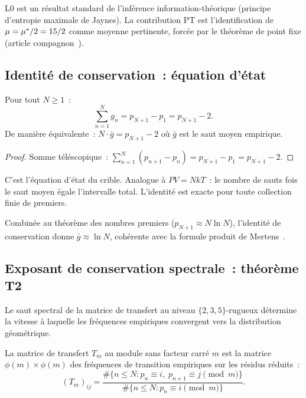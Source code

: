 \documentclass[12pt,a4paper]{article}
\begin{document}
\begin{remarque}
L0 est un résultat standard de l'inférence information-théorique
(principe d'entropie maximale de Jaynes). La contribution PT est
l'identification de $\mu = {\mu^{*}}/2 = 15/2$ comme moyenne
pertinente, forcée par le théorème de point fixe (article
compagnon~\cite{companion_M3}).
\end{remarque}

\subsection{Identité de conservation~: équation d'état}
\label{sec:conservation_id}

\mID
\begin{idbox}
\label{id:conservation}
Pour tout $N \geq 1$~:
\begin{equation}
  \sum_{n=1}^{N} g_n = p_{N+1} - p_1 = p_{N+1} - 2.
  \label{eq:conservation}
\end{equation}
De manière équivalente~: $N \cdot \bar g = p_{N+1} - 2$ où $\bar g$
est le saut moyen empirique.

\begin{proof}
Somme téléscopique~:
$\sum_{n=1}^N (p_{n+1} - p_n) = p_{N+1} - p_1 = p_{N+1} - 2$.
\end{proof}
\end{idbox}

C'est l'équation d'état du crible. Analogue à $PV = NkT$~: le nombre
de sauts fois le saut moyen égale l'intervalle total. L'identité est
exacte pour toute collection finie de premiers.

Combinée au théorème des nombres premiers
($p_{N+1} \approx N \ln N$), l'identité de conservation donne
$\bar g \approx \ln N$, cohérente avec la formule produit de
Mertens~\cite{Mertens1874}.

\subsection{Exposant de conservation spectrale~: théorème T2}
\label{sec:T2}

Le saut spectral de la matrice de transfert au niveau
$\{2,3,5\}$-rugueux détermine la vitesse à laquelle les fréquences
empiriques convergent vers la distribution géométrique.

\begin{definition}
La matrice de transfert $T_m$ au module sans facteur carré $m$ est
la matrice $\phi(m) \times \phi(m)$ des fréquences de transition
empiriques sur les résidus réduits~:
\[
  (T_m)_{ij} = \frac{\#\{n \leq N : p_n \equiv i,\; p_{n+1} \equiv j \pmod m\}}
               {\#\{n \leq N : p_n \equiv i \pmod m\}}.
\]
\end{definition}
\end{document}
